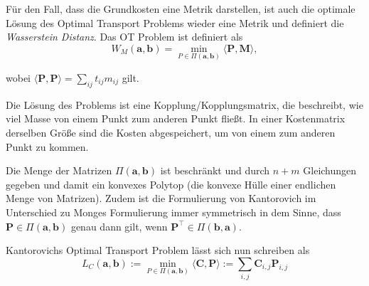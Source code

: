 \documentclass[11pt,a4paper]{article}
\numberwithin{equation}{section}
\begin{document}
	
	
	Für den Fall, dass die Grundkosten eine Metrik darstellen, ist auch die optimale Lösung des Optimal Transport Problems wieder eine Metrik \cite{cuturi2014ground} und definiert die \textit{Wasserstein Distanz}. Das OT Problem ist definiert als
	\begin{equation}
	W_M(\boldsymbol{a},\boldsymbol{b}) = \min_{P \in \Pi(\boldsymbol{a}, \boldsymbol{b})}{\langle \boldsymbol{P}, \boldsymbol{M} \rangle},
	\end{equation}
	
	wobei ${\langle \boldsymbol{P}, \boldsymbol{P} \rangle} = \sum_{ij}{t_{ij}m_{ij}}$ gilt.
	
	Die Lösung des Problems ist eine Kopplung/Kopplungsmatrix, die beschreibt, wie viel Masse von einem Punkt zum anderen Punkt fließt. In einer Kostenmatrix derselben Größe sind die Kosten abgespeichert, um von einem zum anderen Punkt zu kommen.
	
	Die Menge der Matrizen $\Pi(\boldsymbol{a}, \boldsymbol{b})$ ist beschränkt und durch $n+m$ Gleichungen gegeben und damit ein konvexes Polytop (die konvexe Hülle einer endlichen Menge von Matrizen). Zudem ist die Formulierung von Kantorovich im Unterschied zu Monges Formulierung immer symmetrisch in dem Sinne, dass $\boldsymbol{P} \in \Pi (\boldsymbol{a}, \boldsymbol{b})$ genau dann gilt, wenn $\boldsymbol{P}^\top \in \Pi (\boldsymbol{b}, \boldsymbol{a})$.
	
	Kantorovichs Optimal Transport Problem lässt sich nun schreiben als 
	\begin{equation}
	L_C(\boldsymbol{a}, \boldsymbol{b}) := \min_{P \in \Pi(\boldsymbol{a}, \boldsymbol{b})} \langle \boldsymbol{C}, \boldsymbol{P} \rangle := \sum_{i,j}{\boldsymbol{C}_{i,j}\boldsymbol{P}_{i,j}} \label{KOTP}
	\end{equation}
	
\end{document}
